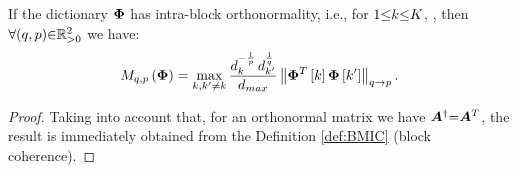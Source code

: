 \begin{property}
\label{prp:IntraBlkO}
If the dictionary $\boldsymbol{\Phi}$ has intra-block orthonormality, i.e., for $1 {\leq} k {\leq} K$, , then 
$\forall (q , p) {\in} \mathbb{R}^2_{>0}$ we have:
\begin{equation*}
M_{q,p}\left( \boldsymbol{\Phi} \right) = \max_{k,k' \neq k} \frac{d_{k}^{-\frac1p} \, d_{k'}^{\frac1q}}{d_{max}} \left\lVert\boldsymbol{\Phi}^T \left[ k \right] \boldsymbol{\Phi} \left[ k' \right]\right\rVert_{q \to p}.
\end{equation*}
\end{property}
\begin{proof}
Taking into account that, for an orthonormal matrix we have $\boldsymbol{A}^\dagger {=} \boldsymbol{A}^T$, the result is immediately obtained from the Definition \ref{def:BMIC} (block coherence).
\end{proof}